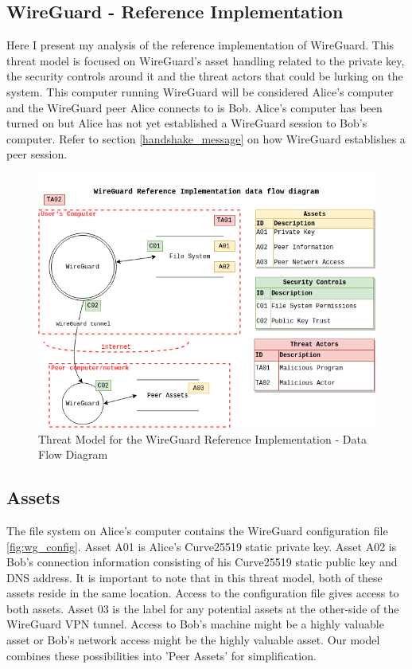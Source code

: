 \documentclass [11pt, proquest] {uwthesis}[2020/02/24]
\begin{document}
\subsection {WireGuard - Reference Implementation}
\label{wg-ref-analysis}


Here I present my analysis of the reference implementation of WireGuard. This threat model is focused on WireGuard's asset handling related to the private key, the security controls around it and the threat actors that could be lurking on the system. This computer running WireGuard will be considered Alice's computer and the WireGuard peer Alice connects to is Bob. Alice's computer has been turned on but Alice has not yet established a WireGuard session to Bob's computer. Refer to section \ref{handshake_message} on how WireGuard establishes a peer session. 

\begin{figure}[ht]
\includegraphics[width=14cm]{paper/images/WG_DFD.drawio.png}
\caption{Threat Model for the WireGuard Reference Implementation - Data Flow Diagram}
\label{fig:wg_ref_dfd}
\end{figure}

\subsection{Assets}
The file system on Alice's computer contains the WireGuard configuration file \ref{fig:wg_config}. 
Asset A01 is Alice's Curve25519 static private key. Asset A02 is Bob's connection information consisting of his Curve25519 static public key and DNS address. It is important to note that in this threat model, both of these assets reside in the same location. Access to the configuration file gives access to both assets.
Asset 03 is the label for any potential assets at the other-side of the WireGuard VPN tunnel. Access to Bob's machine might be a highly valuable asset or Bob's network access might be the highly valuable asset. Our model combines these possibilities into 'Peer Assets' for simplification.
\end{document}
